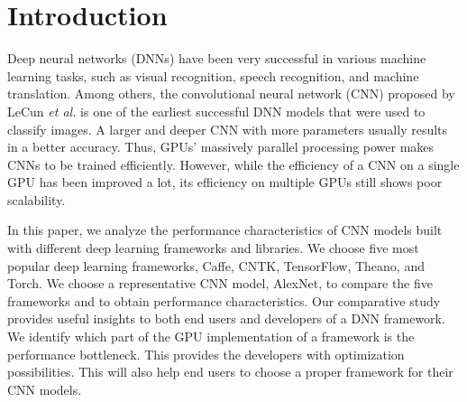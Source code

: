 \section{Introduction}
Deep neural networks (DNNs) have been very successful in various machine learning tasks, such as visual recognition\cite{krizhevsky2012imagenet,vgg,RCNN}, speech recognition\cite{speech}, and machine translation\cite{machinetranslation}. Among others, the convolutional neural network (CNN) proposed by LeCun \textit{et al.}\cite{726791} is one of the earliest successful DNN models that were used to classify images. A larger and deeper CNN with more parameters usually results in a better accuracy. Thus, GPUs' massively parallel processing power makes CNNs to be trained efficiently. However, while the efficiency of a CNN on a single GPU has been improved a lot, its efficiency on multiple GPUs still shows poor scalability\cite{DBLP:journals/corr/YadanATR13}. 

In this paper, we analyze the performance characteristics of CNN models built with different deep learning frameworks and libraries. We choose five most popular deep learning frameworks, Caffe\cite{jia2014caffe}, CNTK\cite{cntk}, TensorFlow\cite{tensorflow2015-whitepaper}, Theano\cite{DBLP:journals/corr/Al-RfouAAa16}, and Torch\cite{torch}. We choose a representative CNN model, AlexNet\cite{krizhevsky2012imagenet}, to compare the five frameworks and to obtain performance characteristics.  Our comparative study provides useful insights to both end users and developers of a DNN framework. We identify which part of the GPU implementation of a framework is the performance bottleneck. This provides the developers with optimization possibilities. This will also help end users to choose a proper framework for their CNN models. 




